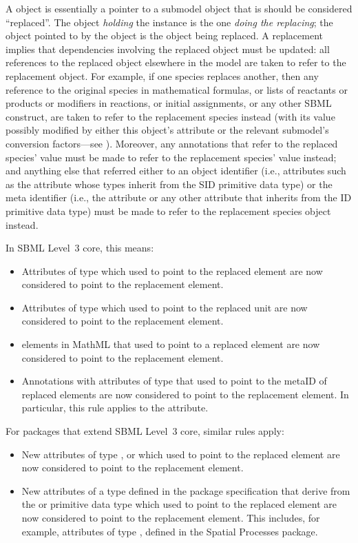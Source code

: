 A \ReplacedElement object is essentially a pointer to a submodel object
that is should be considered ``replaced''.  The object \emph{holding}
the \ReplacedElement instance is the one \emph{doing the replacing}; the
object pointed to by the \ReplacedElement object is the object being
replaced.  A replacement implies that dependencies involving the
replaced object must be updated: all references to the replaced object
elsewhere in the model are taken to refer to the replacement object.
For example, if one species replaces another, then any reference to the
original species in mathematical formulas, or lists of reactants or
products or modifiers in reactions, or initial assignments, or any other
SBML construct, are taken to refer to the replacement species instead
(with its value possibly modified by either this object's
 attribute or the relevant submodel's conversion
factors---see ). Moreover, any annotations
that refer to the replaced species'  value must be made to
refer to the replacement species'  value instead; and
anything else that referred either to an object identifier (i.e., 
attributes such as the  attribute whose types inherit from the SID 
primitive data type) or the meta identifier (i.e., the  attribute 
or any other attribute that inherits from the ID primitive data type) 
must be made to refer to the replacement species object instead. 

In SBML Level~3 core, this means: 
\begin{itemize}
\item Attributes of type  which used to point to the replaced element 
 are now considered to point to the replacement element. 
\item Attributes of type  which used to point to the replaced 
 unit are now considered to point to the replacement element. 
\item {} elements in MathML that used to point to a replaced element are 
 now considered to point to the replacement element. 
\item Annotations with attributes of type  that used to point to 
 the metaID of replaced elements are now considered to point to the 
 replacement element. In particular, this rule applies to the 
  attribute.
\end{itemize}

For packages that extend SBML Level~3 core, similar rules apply: 
\begin{itemize}
\item New attributes of type ,  
 or  which used to point 
 to the replaced element are now considered to point to the replacement 
 element.  
\item New attributes of a type defined in the package specification that 
 derive from the  or  primitive data type which used to 
 point to the replaced element are now considered to point to the 
 replacement element. This includes, for example, attributes of type 
 , defined in the Spatial Processes package. 
\end{itemize}

